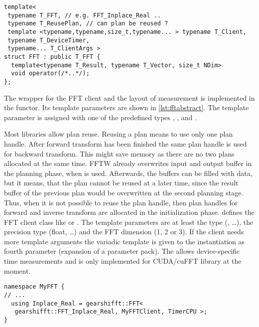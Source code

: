 \begin{lstlisting}[caption={FFT wrapper class},label={lst:fftabstract}]
template<
 typename T_FFT, // e.g. FFT_Inplace_Real ..
 typename T_ReusePlan, // can plan be reused ?
 template <typename,typename,size_t,typename... > typename T_Client,
 typename T_DeviceTimer,
 typename... T_ClientArgs >
struct FFT : public T_FFT {
  template<typename T_Result, typename T_Vector, size_t NDim>
  void operator(/*..*/);
};
\end{lstlisting}

The wrapper for the FFT client and the layout of measurement is implemented in the  functor.
Its template parameters are shown in \cref{lst:fftabstract}. 
The template parameter  is assigned with one of the predefined types , ,  and .

Most libraries allow plan reuse.
Reusing a plan means to use only one plan handle. After forward transform has been finished the same plan handle is used for backward transform.
This might save memory as there are no two plans allocated at the same time. FFTW already overwrites input and output buffer in the planning phase, when  is used. Afterwards, the buffers can be filled with data, but it means, that the plan cannot be reused at a later time, since the result buffer of the previous plan would be overwritten at the second planning stage.
Thus, when it is not possible to reuse the plan handle, then plan handles for forward and inverse transform are allocated in the initialization phase.
%
 defines the FFT client class like  or .
The template parameters are at least the  type (, \ldots), the precision type (float, \ldots) and the FFT dimension (1, 2 or 3). 
If the client needs more template arguments the variadic template  is given to the  instantiation as fourth parameter (expansion of a parameter pack).
The  allows device-specific time measurements and is only implemented for CUDA/cuFFT library at the moment.

\begin{lstlisting}[caption={Define FFT client types for corresponding FFTs},label={lst:implfftusing}]
namespace MyFFT { 
// ...
  using Inplace_Real = gearshifft::FFT<
   gearshifft::FFT_Inplace_Real, MyFFTClient, TimerCPU >;
}
\end{lstlisting}


